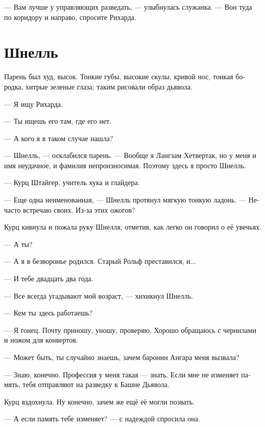 \documentclass[a4paper,10pt,fleqn]{book}\usepackage{polyglossia}\setdefaultlanguage[babelshorthands=true]{russian}\setotherlanguage{english}\defaultfontfeatures{Ligatures=TeX,Mapping=tex-text}\usepackage{xcolor}\newcommand{\ml}[3]{#2}
\begin{document}
--- Вам лучше у управляющих разведать, --- улыбнулась служанка.
--- Вон туда по коридору и направо, спросите Рихарда.

\section{Шнелль}

Парень был худ, высок.
Тонкие губы, высокие скулы, кривой нос, тонкая бородка, хитрые зеленые глаза;
таким рисовали образ дьявола.

--- Я ищу Рихарда.

--- Ты ищешь его там, где его нет.

--- А кого я в таком случае нашла?

--- Шнелль, --- осклабился парень.
--- Вообще я Лангзам Хетвертак, но у меня и имя неудачное, и фамилия непроизносимая.
Поэтому здесь я просто Шнелль.

--- Курц Штайгер, учитель хука и глайдера.

--- Еще одна неименованная, --- Шнелль протянул мягкую тонкую ладонь.
--- Нечасто встречаю своих.
Из-за этих ожогов?

Курц кивнула и пожала руку Шнелля, отметив, как легко он говорил о её увечьях.

--- А ты?

--- А я в безворонье родился.
Старый Рольф преставился, и...

--- И тебе двадцать два года.

--- Все всегда угадывают мой возраст, --- хихикнул Шнелль.

--- Кем ты здесь работаешь?

--- Я гонец.
Почту приношу, уношу, проверяю.
Хорошо обращаюсь с чернилами и ножом для конвертов.

\ml{$0$}
{--- Может быть, ты случайно знаешь, зачем баронин Ангара меня вызвала?}
{``Maybe you know by chance, why Baronin Angara paged me?''}

\ml{$0$}
{--- Знаю, конечно.}
{``Of course I know.}
\ml{$0$}
{Профессия у меня такая --- знать.}
{That's my job, to know.}
\ml{$0$}
{Если мне не изменяет память, тебя отправляют на разведку к Башне Дьявола.}
{If I recall correctly, you're ordered to scout the Teufel Tower.''}

Курц вздохнула.
Ну конечно, зачем же ещё её могли позвать.

\ml{$0$}
{--- А если память тебе изменяет? --- с надеждой спросила она.}
{``Is there any chance you recall incorrectly?'' she asked with hope.}
\end{document}
